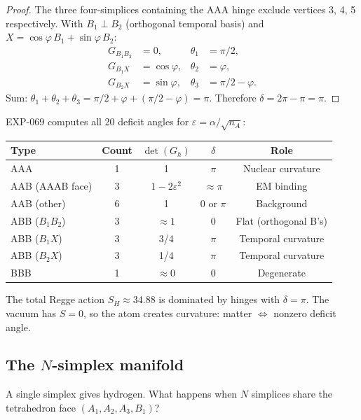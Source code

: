 \begin{remark}
\begin{proof}
The three four-simplices containing the AAA hinge exclude vertices 3, 4, 5 respectively.  With $B_1 \perp B_2$ (orthogonal temporal basis) and $X = \cos\varphi\,B_1 + \sin\varphi\,B_2$:
\begin{align}
G_{B_1 B_2} &= 0, & \theta_1 &= \pi/2, \\
G_{B_1 X} &= \cos\varphi, & \theta_2 &= \varphi, \\
G_{B_2 X} &= \sin\varphi, & \theta_3 &= \pi/2 - \varphi.
\end{align}
Sum: $\theta_1 + \theta_2 + \theta_3 = \pi/2 + \varphi + (\pi/2 - \varphi) = \pi$.  Therefore $\delta = 2\pi - \pi = \pi$.
\end{proof}

\begin{remark}
EXP-069 computes all 20 deficit angles for $\varepsilon = \alpha/\sqrt{n_A}$:
\begin{center}
\begin{tabular}{lcccc}
\hline
Type & Count & $\det(G_h)$ & $\delta$ & Role \\
\hline
AAA & 1 & 1 & $\pi$ & Nuclear curvature \\
AAB (AAAB face) & 3 & $1-2\varepsilon^2$ & $\approx \pi$ & EM binding \\
AAB (other) & 6 & 1 & $0$ or $\pi$ & Background \\
ABB ($B_1 B_2$) & 3 & $\approx 1$ & $0$ & Flat (orthogonal B's) \\
ABB ($B_1 X$) & 3 & 3/4 & $\pi$ & Temporal curvature \\
ABB ($B_2 X$) & 3 & 1/4 & $\pi$ & Temporal curvature \\
BBB & 1 & $\approx 0$ & 0 & Degenerate \\
\hline
\end{tabular}
\end{center}
The total Regge action $S_H \approx 34.88$ is dominated by hinges with $\delta = \pi$.  The vacuum has $S = 0$, so the atom creates curvature: matter $\Leftrightarrow$ nonzero deficit angle.
\end{remark}

\subsection{The $N$-simplex manifold}
\label{sec:n_simplex}

A single simplex gives hydrogen.  What happens when $N$ simplices share the tetrahedron face $(A_1, A_2, A_3, B_1)$?


\end{remark}
